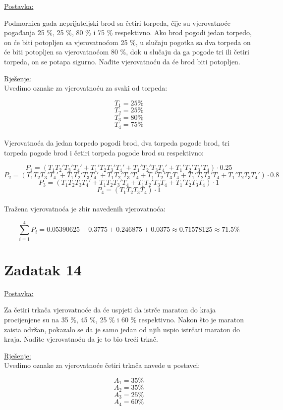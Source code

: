 \documentclass[12pt]{article}
\begin{document}
\underline{Postavka:}
	
Podmornica gađa neprijateljski brod sa četiri torpeda, čije su vjerovatnoće pogađanja 25 \%, 25 \%, 80 \% i 75 \% respektivno. Ako brod pogodi jedan torpedo, on će biti potopljen sa vjerovatnoćom 25 \%, u slučaju pogotka sa dva torpeda on će biti potopljen sa vjerovatnoćom 80 \%, dok u slučaju da ga pogode tri ili četiri torpeda, on se potapa sigurno. Nađite vjerovatnoću da će brod biti potopljen.

\underline{Rješenje:}\\

Uvedimo oznake za vjerovatnoću za svaki od torpeda:

$$T_1 = 25 \%$$
$$T_2 = 25 \%$$
$$T_3 = 80 \%$$
$$T_4 = 75 \%$$\\

Vjerovatnoća da jedan torpedo pogodi brod, dva torpeda pogode brod, tri torpeda pogode brod i četiri torpeda pogode brod su respektivno:

$$P_1 = (T_1 T_2' T_3' T_4' + T_1' T_2 T_3' T_4' + T_1' T_2' T_3 T_4' + T_1' T_2' T_3' T_4 ) \cdot 0.25$$
$$P_2 = (T_1 T_2 T_3' T_4' + T_1 T_2' T_3 T_4' + T_1 T_2' T_3' T_4 +  T_1' T_2' T_3 T_4 +  T_1' T_2 T_3' T_4 +  T_1' T_2 T_3 T_4') \cdot 0.8$$
$$P_3 = (T_1 T_2 T_3 T_4' +  T_1 T_2 T_3' T_4 + T_1 T_2' T_3 T_4 + T_1' T_2 T_3 T_4  ) \cdot 1$$
$$P_4 = (T_1 T_2 T_3 T_4) \cdot 1$$\\

Tražena vjerovatnoća je zbir navedenih vjerovatnoća:

$$\sum_{i=1}^{4} P_i = 0.05390625 + 0.3775 + 0.246875 + 0.0375 \approx 0.71578125 \approx 71.5\%$$

\newpage
\section*{Zadatak 14\label{Z14}}	 

\underline{Postavka:}
	
Za četiri trkača vjerovatnoće da će uspjeti da istrče maraton do kraja procijenjene su na 35 \%, 45 \%, 25 \% i 60 \% respektivno. Nakon što je maraton zaista održan, pokazalo se da je samo jedan od njih uspio istrčati maraton do kraja. Nađite vjerovatnoću da je to bio treći trkač.

\underline{Rješenje:}\\

Uvedimo oznake za vjerovatnoće četiri trkača navede u postavci:

$$A_1 = 35\%$$
$$A_2 = 35\%$$
$$A_3 = 25\%$$
$$A_4 = 60\%$$\\
\end{document}
